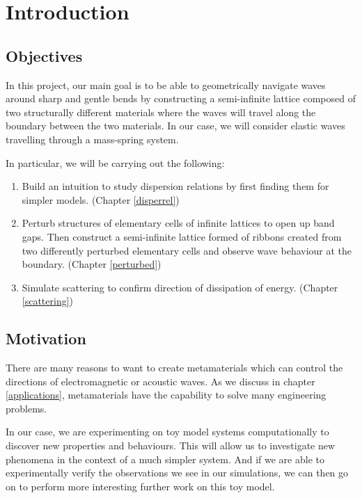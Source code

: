 \chapter{Introduction}

\section{Objectives}
In this project, our main goal is to be able to geometrically navigate waves
around sharp and gentle bends by constructing a semi-infinite lattice composed
of two structurally different materials where the waves will travel along the
boundary between the two materials. In our case, we will consider elastic waves
travelling through a mass-spring system.

In particular, we will be carrying out the following:

\begin{enumerate}
\item Build an intuition to study dispersion relations by first finding them
      for simpler models. (Chapter \ref{disperrel})
\item Perturb structures of elementary cells of infinite lattices to open up
      band gaps. Then construct a semi-infinite lattice formed of ribbons
      created from two differently perturbed elementary cells and observe wave
      behaviour at the boundary. (Chapter \ref{perturbed})
\item Simulate scattering to confirm direction of dissipation of energy.
      (Chapter \ref{scattering})
\end{enumerate}

\section{Motivation}
There are many reasons to want to create metamaterials which can control the
directions of electromagnetic or acoustic waves. As we discuss in chapter
\ref{applications}, metamaterials have the capability to solve many engineering
problems.

In our case, we are experimenting on toy model systems computationally to
discover new properties and behaviours. This will allow us to investigate new
phenomena in the context of a much simpler system. And if we are able to
experimentally verify the observations we see in our simulations, we can then
go on to perform more interesting further work on this toy model.
